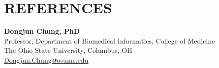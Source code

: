 \documentclass[11pt,a4paper,roman]{moderncv}        %
\begin{document}
\section{REFERENCES}
\textbf{Dongjun Chung, PhD}\\
Professor, Department of Biomedical Informatics, College of Medicine\\
The Ohio State University, Columbus, OH\\
\href{mailto:Dongjun.Chung@osumc.edu}{Dongjun.Chung@osumc.edu}
\end{document}
